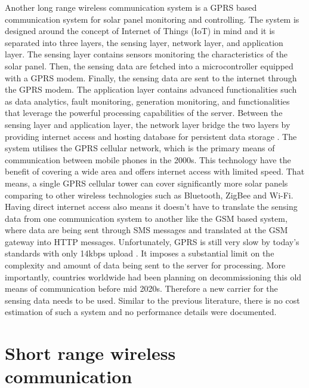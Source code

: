 \documentclass[../thesis.tex]{subfiles}
\begin{document}
Another long range wireless communication system is a GPRS based communication system for solar panel monitoring and controlling. The system is designed around the concept of Internet of Things (IoT) in mind and it is separated into three layers, the sensing layer, network layer, and application layer. The sensing layer contains sensors monitoring the characteristics of the solar panel. Then, the sensing data are fetched into a microcontroller equipped with a GPRS modem. Finally, the sensing data are sent to the internet through the GPRS modem. The application layer contains advanced functionalities such as data analytics, fault monitoring, generation monitoring, and functionalities that leverage the powerful processing capabilities of the server. Between the sensing layer and application layer, the network layer bridge the two layers by providing internet access and hosting database for persistent data storage \cite{AdhyaSoham2016AIbs}. The system utilises the GPRS cellular network, which is the primary means of communication between mobile phones in the 2000s. This technology have the benefit of covering a wide area and offers internet access with limited speed. That means, a single GPRS cellular tower can cover significantly more solar panels comparing to other wireless technologies such as Bluetooth, ZigBee and Wi-Fi. Having direct internet access also means it doesn't have to translate the sensing data from one communication system to another like the GSM based system, where data are being sent through SMS messages and translated at the GSM gateway into HTTP messages. Unfortunately, GPRS is still very slow by today's standards with only 14kbps upload  \cite{3gpp.org}. It imposes a substantial limit on the complexity and amount of data being sent to the server for processing. More importantly, countries worldwide had been planning on decommissioning this old means of communication before mid 2020s. Therefore a new carrier for the sensing data needs to be used. Similar to the previous literature, there is no cost estimation of such a system and no performance details were documented. 


\section{Short range wireless communication}
\end{document}
